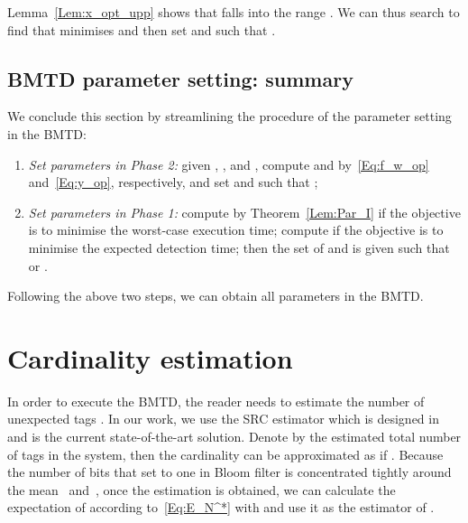 \documentclass[10pt, twocolumn]{IEEEtran}
\begin{document}
Lemma~\ref{Lem:x_opt_upp} shows that  falls into the range . We can thus search  to find  that minimises  and then set  and  such that .

\begin{comment}
\begin{algorithm}[H]
\caption{Search for the optimal value of .}
\begin{algorithmic}[1]
\REQUIRE{, , , .}
\ENSURE{the optimal value . }
\STATE \textbf{Initialisation:} ;
\STATE Calculate  following~\eqref{Eq:x*} in Lemma~\ref{Lem:Par_I};
\FOR{ to }
     \STATE Compute  by substituting  into~\eqref{Eq:E[T_D]};
     \IF{}
        \STATE ;
        \STATE ;
     \ENDIF
\ENDFOR
\STATE Return ;
\end{algorithmic}
\label{Al:x_op}
\end{algorithm}
\end{comment}

\subsection{BMTD parameter setting: summary}

We conclude this section by streamlining the procedure of the parameter setting in the BMTD:
\begin{enumerate}
\item \emph{Set parameters in Phase 2:} given , ,  and , compute  and 
      by~\eqref{Eq:f_w_op} and~\eqref{Eq:y_op}, respectively, and set  and  such that ;
\item \emph{Set parameters in Phase 1:} compute  by Theorem~\ref{Lem:Par_I} if the objective is to minimise the worst-case execution time; compute  if the objective is to minimise the expected detection time; then the set of  and  is given such that  or .
\end{enumerate}
Following the above two steps, we can obtain all parameters in the BMTD.

\section{Cardinality estimation}
\label{sec:estimation}
In order to execute the BMTD, the reader needs to estimate the number of unexpected tags . In our work, we use the SRC estimator which is designed in~\cite{chen2013understanding} and is the current state-of-the-art solution. Denote by  the estimated total number of tags in the system, then the cardinality  can be approximated as  if .
Because the number of bits that set to one in Bloom filter is concentrated tightly around the mean~\cite{mitzenmacher2005probability} and~\cite{hao2007building}, once the estimation  is obtained, we can calculate the expectation of  according to~\eqref{Eq:E_N^*} with  and use it as the estimator of .
\end{document}
